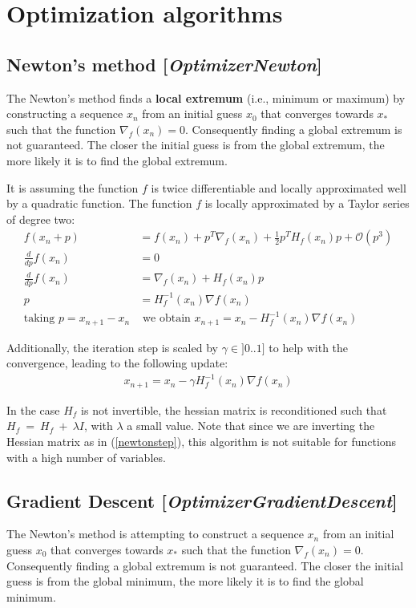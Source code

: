 \documentclass[11pt]{article}
\newcommand{\bigO}{\mathcal{O}}
\newcommand{\nllref}[1]{[\small{\textit{#1}}]}
\begin{document}
\section{Optimization algorithms}
\subsection{Newton's method \nllref{OptimizerNewton}}
The Newton's method finds a \textbf{local extremum} (i.e., minimum or maximum) by constructing a sequence $x_n$ from an initial guess $x_0$ that converges towards $x_*$ such that the function $\nabla_f(x_n)=0$. Consequently finding a global extremum is not guaranteed. The closer the initial guess is from the global extremum, the more likely it is to find the global extremum.

It is assuming the function $f$ is twice differentiable and locally approximated well by a quadratic function. The function $f$ is locally approximated by a Taylor series of degree two:
\begin{align}
f(x_n + p)&= f(x_n) + p^T \nabla_f(x_n) + \frac{1}{2} p^T H_f(x_n) p + \bigO(p^3) \nonumber\\
\frac{d}{dp}f(x_n) &= 0 \nonumber\\
\frac{d}{dp}f(x_n) &=\nabla_f(x_n) + H_f(x_n) p \nonumber\\
p &= H_f^{-1}(x_n) \nabla{f}(x_n) \nonumber\\
\text{taking~} p = x_{n+1} - x_n \nonumber
&\text{~we obtain~} x_{n+1} = x_n - H_f^{-1}(x_n) \nabla{f}(x_n)
\end{align}

Additionally, the iteration step is scaled by $\gamma \in ]0..1]$ to help with the convergence, leading to the following update:
\begin{align}
x_{n+1} = x_n - \gamma H_f^{-1}(x_n) \nabla{f}(x_n) \label{newtonstep}
\end{align}

In the case $H_f$ is not invertible, the hessian matrix is reconditioned such that $H_f~=~H_f~+~\lambda I$, with $\lambda$ a small value. Note that since we are inverting the Hessian matrix as in (\ref{newtonstep}), this algorithm is not suitable for functions with a high number of variables.

\subsection{Gradient Descent \nllref{OptimizerGradientDescent}}
The Newton's method is attempting to construct a sequence $x_n$ from an initial guess $x_0$ that converges towards $x_*$ such that the function $\nabla_f(x_n)=0$. Consequently finding a global extremum is not guaranteed. The closer the initial guess is from the global minimum, the more likely it is to find the global minimum.
\end{document}
